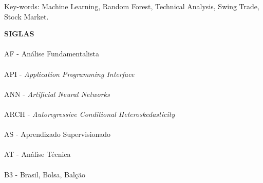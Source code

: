\noindent Key-words: Machine Learning, Random Forest, Technical Analysis, Swing Trade, Stock Market.

\pagebreak


\begin{center}
\textbf{SIGLAS}
\end{center}

\paragraph{}AF - Análise Fundamentalista
\paragraph{}API - \textit{Application Programming Interface}
\paragraph{}ANN - \textit{Artificial Neural Networks}
\paragraph{}ARCH - \textit{Autoregressive Conditional Heteroskedasticity}
\paragraph{}AS - Aprendizado Supervisionado
\paragraph{}AT - Análise Técnica
\paragraph{}B3 - Brasil, Bolsa, Balção
